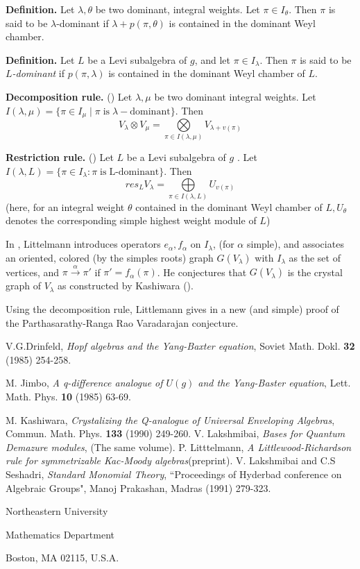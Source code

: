 \medskip
\noindent
{\bfseries {} Definition.}\label{A. 7. Definition.} Let $\lambda, \theta$ be two dominant, integral weights. Let $\pi \in I_{\theta}$. Then $\pi$ is said to be $\lambda$-dominant if $\lambda + p(\pi, \theta)$ is contained in the dominant Weyl chamber.

\medskip
\noindent
{\bfseries {} Definition.}\label{A. 8. Definition.} Let $L$ be a Levi subalgebra of $g$, and let $\pi \in I_{\lambda}$.  Then $\pi$ is said to be \textit{$L$-dominant} if $p(\pi, \lambda)$ is contained in the dominant Weyl chamber of $L$. 


\medskip
\noindent
{\bfseries Decomposition rule.} (\cite{chap10-keyLi}) Let $\lambda, \mu$ be two dominant integral weights. Let $I(\lambda, \mu) = \{\pi \in I_{\mu} \; | \; \pi\; \text{is}\; \lambda-\text{dominant}\}$. Then
$$
V_{\lambda} \otimes V_{\mu} = \bigotimes\limits_{\pi \in I(\lambda, \mu)}V_{\lambda +v(\pi)}
$$

\medskip
\noindent
{\bfseries Restriction rule.} (\cite{chap10-keyLi}) Let $L$ be a  Levi subalgebra of $g$ . Let $ I(\lambda, L) = \{\pi \in I_{\lambda}: \pi \; \text{is}\; \text{L-dominant}\}$. Then
$$
res_{L}V_{\lambda} = \bigoplus\limits_{\pi \in I(\lambda, L)}U_{v(\pi)}
$$
(here, for an integral weight $\theta$ contained in the dominant Weyl chamber of $L, U_{\theta}$ denotes the corresponding simple highest weight module of $L$)

In \cite{chap10-keyLi}, Littelmann introduces operators $e_{\alpha}, f_{\alpha}$ on $I_{\lambda}$, (for $\alpha$ simple), and associates an oriented, colored (by the simples roots) graph $G(V_{\lambda})$ with $I_{\lambda}$ as the set of vertices, and $\pi \xrightarrow{\alpha} \pi'$ if $\pi' =f_{\alpha}(\pi)$. He conjectures that $ G(V_{\lambda})$ is  the crystal graph of $V_{\lambda}$ as constructed by Kashiwara (\cite{chap10-keyK}). 

Using the decomposition rule, Littlemann gives in \cite{chap10-keyLi} a new (and simple) proof of the Parthasarathy-Ranga Rao Varadarajan conjecture.

\begin{thebibliography}{99}
 V.G.\pageoriginale Drinfeld, \textit{Hopf algebras and the Yang-Baxter equation}, Soviet Math. Dokl. {\bf 32} (1985) 254-258.

 M. Jimbo, \textit{A q-difference analogue of $U(g)$ and the Yang-Baster equation}, Lett. Math. Phys. {\bf 10} (1985) 63-69.

 M. Kashiwara, \textit{Crystalizing the Q-analogue of Universal Enveloping Algebras}, Commun. Math. Phys. {\bf 133} (1990) 249-260.
V. Lakshmibai, \textit{Bases for Quantum Demazure modules}, (The same volume).
 P. Litttelmann, \textit{A Littlewood-Richardson rule for symmetrizable Kac-Moody algebras}(preprint).
 V. Lakshmibai and C.S Seshadri, \textit{Standard Monomial Theory}, ``Proceedings of Hyderbad conference on Algebraic Groups", Manoj Prakashan, Madras (1991) 279-323.
\end{thebibliography}

\bigskip

\begin{flushleft}
Northeastern University

Mathematics Department

Boston, MA 02115, U.S.A.
\end{flushleft}
